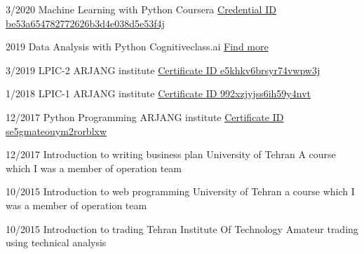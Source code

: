 \documentclass[9pt]{developercv}
\begin{document}
\begin{entrylist}
	\entry
	{3/2020}
	{Machine Learning with Python}
	{Coursera}
	{{\href{https://www.coursera.org/account/accomplishments/records/8KNW27XHXTVF?utm_medium=Certificate&utm_source=link&utm_campaign=copybutton_Certificate}{Credential ID be53a654782772626b3d4e038d5e53f4j}}
	}
\end{entrylist}
\begin{entrylist}
	\entry
	{2019}
	{Data Analysis with Python}
	{Cognitiveclass.ai}
	{{\href{https://cognitiveclass.ai/courses/data-analysis-python}{Find more}}
	}
\end{entrylist}
\begin{entrylist}
	\entry
	{3/2019}
	{LPIC-2}
	{ARJANG institute}
	{{\href{http://gotoclass.ir/Certificates/e5khkv6brsyr74vwpw3j/}{Certificate ID e5khkv6brsyr74vwpw3j}}
	}
\end{entrylist}
\begin{entrylist}
	\entry
	{1/2018}
	{LPIC-1}
	{ARJANG institute}
	{{\href{http://gotoclass.ir/Certificates/992xzjyjss6ih59y4nvt/}{Certificate ID 992xzjyjss6ih59y4nvt}}
	}
\end{entrylist}
\begin{entrylist}
	\entry
	{12/2017}
	{Python Programming}
	{ARJANG institute}
	{{\href{http://gotoclass.ir/Certificates/se5gmateouym2rorblxw/}{Certificate ID se5gmateouym2rorblxw}}
	}
\end{entrylist}
\begin{entrylist}
	\entry
	{12/2017}
	{Introduction to writing business plan}
	{University of Tehran}
	{A course which I was a member of operation team}
\end{entrylist}
\begin{entrylist}
	\entry
	{10/2015}
	{Introduction to web programming}
	{University of Tehran}
	{a course which I was a member of operation team}
\end{entrylist}
\begin{entrylist}
	\entry
	{10/2015}
	{Introduction to trading}
	{Tehran Institute Of Technology}
	{Amateur trading using technical analysis}
\end{entrylist}

\end{document}
